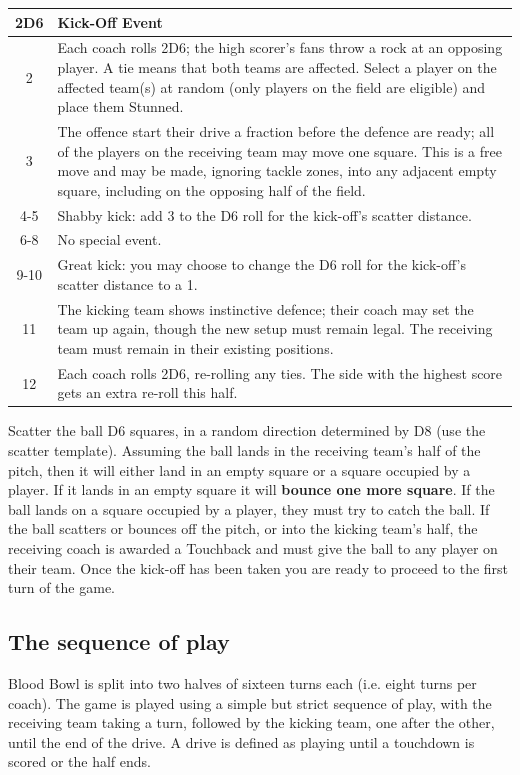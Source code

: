 \documentclass{article}
\begin{document}
\begin{multicols}{2}
\medskip
\begin{tabularx}{\linewidth}{ | c | X | }
\hline
\textbf{2D6} & \textbf{Kick-Off Event} \\ 
\hline
2 & Each coach rolls 2D6; the high scorer's fans throw a rock at an opposing player. A tie means that both teams are affected. Select a player on the affected team(s) at random (only players on the field are eligible) and place them Stunned. \\
\hline
3 & The offence start their drive a fraction before the defence are ready; all of the players on the receiving team may move one square. This is a free move and may be made, ignoring tackle zones, into any adjacent empty square, including on the opposing half of the field. \\
\hline
4-5 & Shabby kick: add 3 to the D6 roll for the kick-off's scatter distance.\\
\hline
6-8 & No special event. \\
\hline
9-10 & Great kick: you may choose to change the D6 roll for the kick-off's scatter distance to a 1.
\\ \hline
11 & The kicking team shows instinctive defence; their coach may set the team up again, though the new setup must remain legal. The receiving team must remain in their existing positions. \\
\hline
12 & Each coach rolls 2D6, re-rolling any ties. The side with the highest score gets an extra re-roll this half. \\
\hline
\end{tabularx}
\medskip

\par Scatter the ball D6 squares, in a random direction determined by D8 (use the scatter template). Assuming the ball lands in the receiving team's half of the pitch, then it will either land in an empty square or a square occupied by a player. If it lands in an empty square it will \textbf{bounce one more square}. If the ball lands on a square occupied by a player, they must try to catch the ball. If the ball scatters or bounces off the pitch, or into the kicking team's half, the receiving coach is awarded a Touchback and must give the ball to any player on their team. Once the kick-off has been taken you are ready to proceed to the first turn of the game.

\subsection{The sequence of play}
\par Blood Bowl is split into two halves of sixteen turns each (i.e. eight turns per coach). The game is played using a simple but strict sequence of play, with the receiving team taking a turn, followed by the kicking team, one after the other, until the end of the drive. A drive is defined as playing until a touchdown is scored or the half ends.


\end{multicols}
\end{document}
